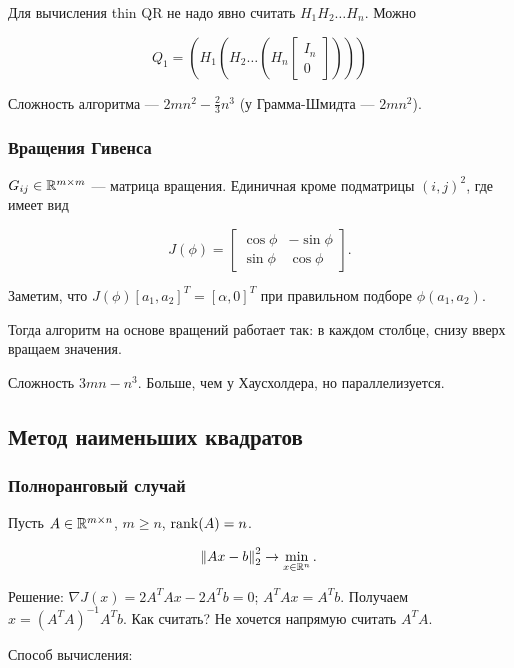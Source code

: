 Для вычисления thin QR не надо явно считать $H_1 H_2 \dots H_n$. Можно

\[
    Q_1 = \left( H_1 \left( H_2 \dots \left( H_n
    \begin{bmatrix} I_n \\ 0 \end{bmatrix} \right) \right) \right)
\]

Сложность алгоритма --- $2 m n^2 - \frac{2}{3} n^3$ (у Грамма-Шмидта ---
$2 m n^2$).

\subsubsection{Вращения Гивенса}

$G_{i j} \in \mathbb{R}^{m \times m}$ --- матрица вращения. Единичная кроме подматрицы
$(i, j)^2$, где имеет вид

\[
    J(\phi) = \begin{bmatrix}
        \cos{\phi} & -\sin{\phi} \\
        \sin{\phi} & \cos{\phi}
    \end{bmatrix}.
\]

Заметим, что $J(\phi) [a_1, a_2]^T = [\alpha, 0]^T$ при правильном подборе
$\phi(a_1, a_2)$.

Тогда алгоритм на основе вращений работает так: в каждом столбце, снизу вверх
вращаем значения.

Сложность $3 m n - n^3$. Больше, чем у Хаусхолдера, но параллелизуется.

\subsection{Метод наименьших квадратов}

\subsubsection{Полноранговый случай}

Пусть $A \in \mathbb{R}^{m \times n}$, $m \ge n$, $\operatorname{rank}(A) = n$.

\[
    \norm{A x - b}_2^2 \to \min_{x \in \mathbb{R}^n}.
\]

Решение: $\nabla J(x) = 2 A^T A x - 2 A^T b = 0$; $A^T A x = A^T b$. Получаем
$x = (A^T A)^{-1} A^T b$. Как считать? Не хочется напрямую считать $A^T A$.

Способ вычисления:

